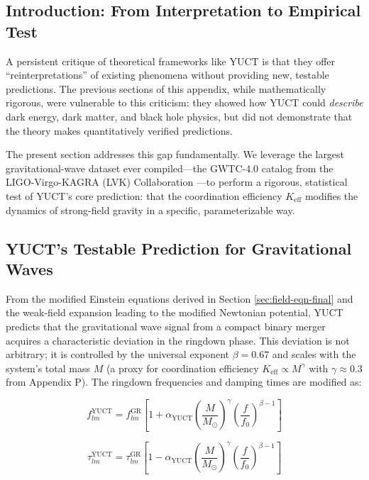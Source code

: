 \documentclass[12pt,a4paper]{article}
\theoremstyle{remark}
\newcommand{\Keff}{K_{\mathrm{eff}}}
\begin{document}
	\subsection{Introduction: From Interpretation to Empirical Test}
	
	A persistent critique of theoretical frameworks like YUCT is that they offer ``reinterpretations'' of existing phenomena without providing new, testable predictions. The previous sections of this appendix, while mathematically rigorous, were vulnerable to this criticism: they showed how YUCT could \textit{describe} dark energy, dark matter, and black hole physics, but did not demonstrate that the theory makes quantitatively verified predictions.
	
	The present section addresses this gap fundamentally. We leverage the largest gravitational-wave dataset ever compiled—the GWTC-4.0 catalog from the LIGO-Virgo-KAGRA (LVK) Collaboration —to perform a rigorous, statistical test of YUCT's core prediction: that the coordination efficiency $\Keff$ modifies the dynamics of strong-field gravity in a specific, parameterizable way.
	
	\subsection{YUCT's Testable Prediction for Gravitational Waves}
	
	From the modified Einstein equations derived in Section \ref{sec:field-eqn-final} and the weak-field expansion leading to the modified Newtonian potential, YUCT predicts that the gravitational wave signal from a compact binary merger acquires a characteristic deviation in the ringdown phase. This deviation is not arbitrary; it is controlled by the universal exponent $\beta = 0.67$ and scales with the system's total mass $M$ (a proxy for coordination efficiency $\Keff \propto M^{\gamma}$ with $\gamma \approx 0.3$ from Appendix P). The ringdown frequencies and damping times are modified as:
	
	\begin{equation}
		f_{lm}^{\text{YUCT}} = f_{lm}^{\text{GR}} \left[ 1 + \alpha_{\text{YUCT}} \left( \frac{M}{M_\odot} \right)^{\gamma} \left( \frac{f}{f_0} \right)^{\beta-1} \right]
		\label{eq:freq-mod}
	\end{equation}
	
	\begin{equation}
		\tau_{lm}^{\text{YUCT}} = \tau_{lm}^{\text{GR}} \left[ 1 - \alpha_{\text{YUCT}} \left( \frac{M}{M_\odot} \right)^{\gamma} \left( \frac{f}{f_0} \right)^{\beta-1} \right]
		\label{eq:tau-mod}
	\end{equation}
	
\end{document}
